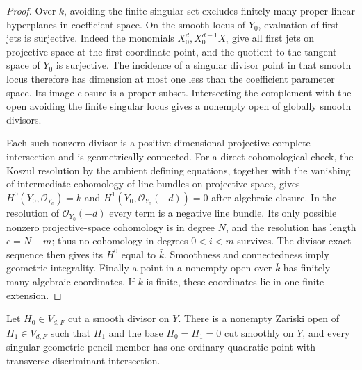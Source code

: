 \begin{proof}
Over $\bar k$, avoiding the finite singular set excludes
finitely many proper linear hyperplanes in coefficient space.
On the smooth locus of $Y_0$, evaluation of first jets is
surjective.  Indeed the monomials $X_0^d,X_0^{d-1}X_i$
give all first jets on projective space at the first
coordinate point, and the quotient to the tangent space of
$Y_0$ is surjective.  The incidence of a singular divisor
point in that smooth locus therefore has dimension at most
one less than the coefficient parameter space.  Its image
closure is a proper subset.  Intersecting the complement
with the open avoiding the finite singular locus gives
a nonempty open of globally smooth divisors.

Each such nonzero divisor is a positive-dimensional
projective complete intersection and is geometrically
connected.  For a direct cohomological check, the Koszul
resolution by the ambient defining equations, together
with the vanishing of intermediate cohomology of line
bundles on projective space, gives
$H^0(Y_0,\mathcal O_{Y_0})=k$ and
$H^1(Y_0,\mathcal O_{Y_0}(-d))=0$ after algebraic closure.
In the resolution of $\mathcal O_{Y_0}(-d)$ every term
is a negative line bundle.  Its only possible nonzero
projective-space cohomology is in degree $N$, and the
resolution has length $c=N-m$; thus no cohomology in
degrees $0<i<m$ survives.  The divisor exact sequence
then gives its $H^0$ equal to $\bar k$.
Smoothness and connectedness imply geometric integrality.
Finally a point in a nonempty open over $\bar k$ has
finitely many algebraic coordinates.  If $k$ is finite,
these coordinates lie in one finite extension.
\end{proof}

\begin{lemma}
\label{r18ce:fixed-pencil}
Let $H_0\in V_{d,F}$ cut a smooth divisor on $Y$.
There is a nonempty Zariski open of $H_1\in V_{d,F}$
such that $H_1$ and the base $H_0=H_1=0$ cut smoothly
on $Y$, and every singular geometric pencil member has
one ordinary quadratic point with transverse discriminant
intersection.
\end{lemma}

